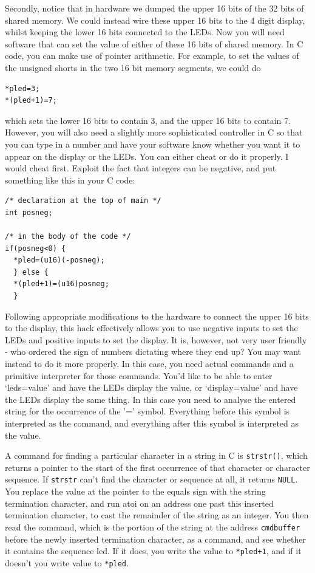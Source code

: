 \documentclass[../physical_computing.tex]{subfiles}
\begin{document}
Secondly, notice that in hardware we dumped the upper 16 bits of the 32 bits of shared memory. We
could instead wire these upper 16 bits to the 4 digit display, whilst keeping the lower 16 bits
connected to the LEDs. Now you will need software that can set the value of either of these 16 bits
of shared memory. In C code, you can make use of pointer arithmetic. For example, to set the values
of the unsigned shorts in the two 16 bit memory segments, we could do

\begin{verbatim}
*pled=3;
*(pled+1)=7;
\end{verbatim}

which sets the lower 16 bits to contain 3, and the upper 16 bits to contain 7. However, you will 
also need a slightly more sophisticated controller in C so that you can type in a number and have
your software know whether you want it to appear on the display or the LEDs. You can either cheat
or do it properly. I would cheat first. Exploit the fact that integers can be negative, and put 
something like this in your C code:

\begin{verbatim}
/* declaration at the top of main */
int posneg;

/* in the body of the code */
if(posneg<0) {
  *pled=(u16)(-posneg);
  } else {
  *(pled+1)=(u16)posneg;
  }
\end{verbatim}

Following appropriate modifications to the hardware to connect the upper 16 bits to the display, 
this hack effectively allows you to use negative inputs to set the LEDs and positive inputs to set the
display. It is, however, not very user friendly - who ordered the sign of numbers dictating where
they end up? You may want instead to do it more properly. In this case, you need actual commands and a
primitive interpreter for those commands. You'd like to be able to enter `leds=value' and have the
LEDs display the value, or `display=value' and have the LEDs display the same thing. In this case
you need to analyse the entered string for the occurrence of the '=' symbol. Everything before this 
symbol is interpreted as the command, and everything after this symbol is interpreted as the value. 

A command for finding a particular character in a string in C is \texttt{strstr()}, which returns a
pointer to the start of the first occurrence of that character or character sequence.
If \texttt{strstr} can't find the character or sequence at all, it
returns \texttt{NULL}. You replace the value at the pointer to the equals sign with the string termination 
character, and run atoi on an address one past this inserted termination character, to cast the remainder
of the string as an integer. You then read the command, which is the portion of the string at the 
address \texttt{cmdbuffer} before the newly inserted termination character, as a command, and see whether
it contains the sequence led. If it does, you write the value to \texttt{*pled+1}, and if it doesn't you write
value to \texttt{*pled}.
\end{document}
